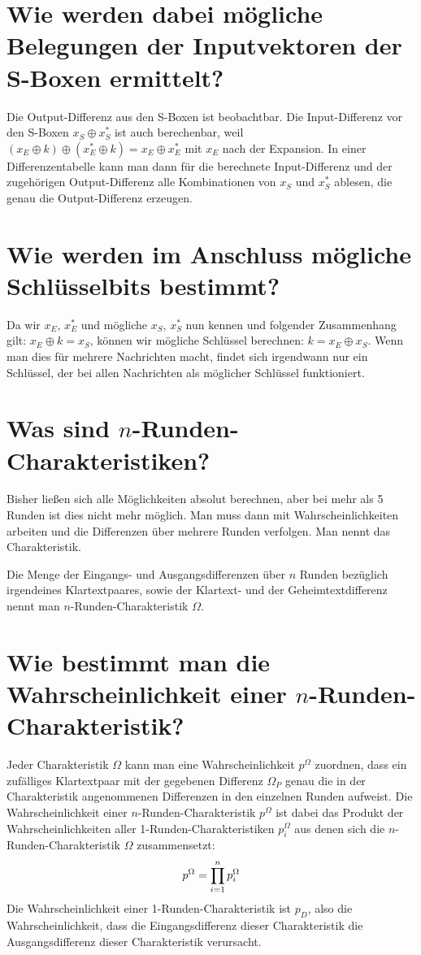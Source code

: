 \documentclass{article}
\begin{document}
	\section*{Wie werden dabei mögliche Belegungen der Inputvektoren der S-Boxen ermittelt?}
	Die Output-Differenz aus den S-Boxen ist beobachtbar. Die Input-Differenz vor den S-Boxen $x_S\oplus x_S^\ast$ ist auch berechenbar, weil $(x_E \oplus k) \oplus (x_E^\ast \oplus k) = x_E \oplus x_E^\ast$ mit $x_E$ nach der Expansion. In einer Differenzentabelle kann man dann für die berechnete Input-Differenz und der zugehörigen Output-Differenz alle Kombinationen von $x_S$ und $x_S^\ast$ ablesen, die genau die Output-Differenz erzeugen.
	
	\section*{Wie werden im Anschluss mögliche Schlüsselbits bestimmt?}
	Da wir $x_E$, $x_E^\ast$ und mögliche $x_S$, $x_S^\ast$ nun kennen und folgender Zusammenhang gilt: $x_E \oplus k = x_S$, können wir mögliche Schlüssel berechnen: $k = x_E \oplus x_S$. Wenn man dies für mehrere Nachrichten macht, findet sich irgendwann nur ein Schlüssel, der bei allen Nachrichten als möglicher Schlüssel funktioniert.
	
	\section*{Was sind $n$-Runden-Charakteristiken?}
	Bisher ließen sich alle Möglichkeiten absolut berechnen, aber bei mehr als 5 Runden ist dies nicht mehr möglich. Man muss dann mit Wahrscheinlichkeiten arbeiten und die Differenzen über mehrere Runden verfolgen. Man nennt das Charakteristik.
	
	Die Menge der Eingangs- und Ausgangsdifferenzen über $n$ Runden bezüglich irgendeines Klartextpaares, sowie der Klartext- und der Geheimtextdifferenz nennt man $n$-Runden-Charakteristik $\Omega$.
	
	\section*{Wie bestimmt man die Wahrscheinlichkeit einer $n$-Runden-Charakteristik?}
	Jeder Charakteristik $\Omega$ kann man eine Wahrscheinlichkeit $p^\Omega$ zuordnen, dass ein zufälliges Klartextpaar mit der gegebenen Differenz $\Omega_P$ genau die in der Charakteristik angenommenen Differenzen in den einzelnen Runden aufweist. Die Wahrscheinlichkeit einer $n$-Runden-Charakteristik $p^\Omega$ ist dabei das Produkt der Wahrscheinlichkeiten aller 1-Runden-Charakteristiken $p_i^\Omega$ aus denen sich die $n$-Runden-Charakteristik $\Omega$ zusammensetzt:
	\begin{align}
		p^\Omega = \prod_{i=1}^{n} p_i^\Omega \notag
	\end{align}
	Die Wahrscheinlichkeit einer 1-Runden-Charakteristik ist $p_D$, also die Wahrscheinlichkeit, dass die Eingangsdifferenz dieser Charakteristik die Ausgangsdifferenz dieser Charakteristik verursacht.
	
\end{document}
